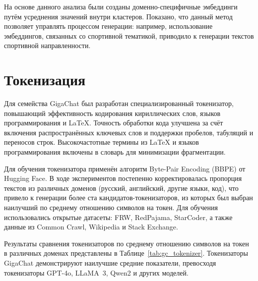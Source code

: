 На основе данного анализа были созданы доменно-специфичные эмбеддинги путём усреднения значений внутри кластеров. Показано, что данный метод позволяет управлять процессом генерации: например, использование эмбеддингов, связанных со спортивной тематикой, приводило к генерации текстов спортивной направленности.

\section{Токенизация}\label{sec:gc_tokenizer}

Для семейства GigaChat был разработан специализированный токенизатор, повышающий эффективность кодирования кириллических слов, языков программирования и LaTeX. Точность обработки кода улучшена за счёт включения распространённых ключевых слов и поддержки пробелов, табуляций и переносов строк. Высокочастотные термины из LaTeX и языков программирования включены в словарь для минимизации фрагментации.

Для обучения токенизатора применён алгоритм Byte-Pair Encoding (BBPE) от Hugging Face. В ходе экспериментов постепенно корректировалась пропорция текстов из различных доменов (русский, английский, другие языки, код), что привело к генерации более ста кандидатов-токенизаторов, из которых был выбран наилучший по среднему отношению символов на токен. Для обучения использовались открытые датасеты: FRW, RedPajama, StarCoder, а также данные из Common Crawl, Wikipedia и Stack Exchange.

Результаты сравнения токенизаторов по среднему отношению символов на токен в различных доменах представлены в Таблице~\ref{tab:gc_tokenizer}. Токенизаторы GigaChat демонстрируют наилучшие средние показатели, превосходя токенизаторы GPT-4o, LLaMA~3, Qwen2 и других моделей.

